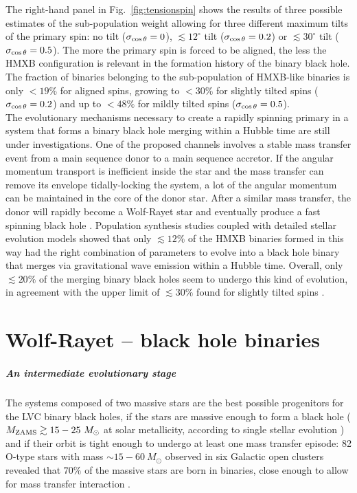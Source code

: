 \documentclass[a4paper,titlepage]{book}     	%
\newcommand{\sun}{\ensuremath{_\odot}}
\newcommand{\mzams}{M_\textup{ZAMS}}
\newcommand{\msun}{\ensuremath{M\sun}}
\begin{document}
The right-hand panel in Fig.\ \ref{fig:tensionspin} shows the results of three possible estimates of the sub-population weight allowing for three different maximum tilts of the primary spin: no tilt ($\sigma_{\rm \cos \theta} = 0$), $\lesssim 12^{\circ}$ tilt ($\sigma_{\rm \cos \theta} = 0.2$) or $\lesssim 30^{\circ}$ tilt ($\sigma_{\rm \cos \theta} = 0.5$). The more the primary spin is forced to be aligned, the less the HMXB configuration is relevant in the formation history of the binary black hole. The fraction of binaries belonging to the sub-population of HMXB-like binaries is only $< 19 \% $ for aligned spins, growing to $< 30 \%$ for slightly tilted spins ($\sigma_{\rm \cos \theta} = 0.2$) and up to $< 48 \%$ for mildly tilted spins ($\sigma_{\rm \cos \theta} = 0.5$).\\

The evolutionary mechanisms necessary to create a rapidly spinning primary in a system that forms a binary black hole merging within a Hubble time are still under investigations. One of the proposed channels involves a stable mass transfer event from a main sequence donor to a main sequence accretor. If the angular momentum transport is inefficient inside the star and the mass transfer can remove its envelope tidally-locking the system, a lot of the angular momentum can be maintained in the core of the donor star. After a similar mass transfer, the donor will rapidly become a Wolf-Rayet star and eventually produce a fast spinning black hole \cite{spinfastBH_Qin2019}. Population synthesis studies coupled with detailed stellar evolution models showed that only $\lesssim 12 \%$ of the HMXB binaries formed in this way had the right combination of parameters to evolve into a black hole binary that merges via gravitational wave emission within a Hubble time. Overall, only $\lesssim 20 \%$ of the merging binary black holes seem to undergo this kind of evolution, in agreement with the upper limit of $\lesssim 30 \%$ found for slightly tilted spins \cite{HMXBHspins2022}.




\chapter{Wolf-Rayet -- black hole binaries}\label{ch:WR--BH}
\paragraph{An intermediate evolutionary stage}
The systems composed of two massive stars are the best possible progenitors for the LVC binary black holes, if the stars are massive enough to form a black hole ($\mzams \gtrsim 15-25~\msun$ at solar metallicity, according to single stellar evolution \cite{Limongi2017_handbookSN}) and if their orbit is tight enough to undergo at least one mass transfer episode: 82 O-type stars with mass $\sim 15-60~\msun$ observed in six Galactic open clusters revealed that $70 \%$ of the massive stars are born in binaries, close enough to allow for mass transfer interaction \cite{Sana2012}. 
\end{document}
